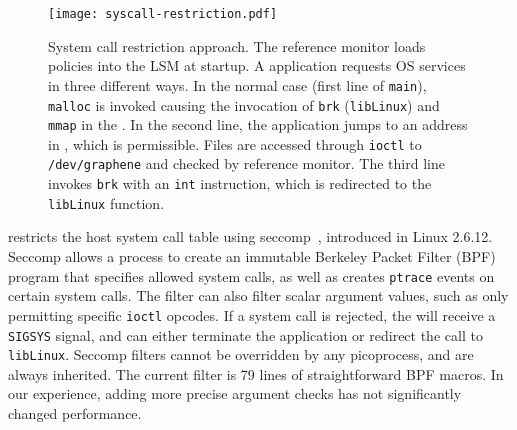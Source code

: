


\begin{figure}[t!]
\centering
\texttt{[image: syscall-restriction.pdf]}
\footnotesize
\caption[System call restriction approach in sysname{}]
{System call restriction approach. The reference monitor loads policies into the LSM at startup.  A \graphene{} application requests OS services in three different ways. 
In the normal case (first line of {\tt main}), {\tt malloc} is invoked causing the invocation of {\tt brk} ({\tt libLinux}) and {\tt mmap} in the \pal{}. In the second line, the application jumps to an address in \pal{}, which is permissible.
Files are accessed through {\tt ioctl} to {\tt /dev/graphene} and checked by reference monitor.
The third line invokes {\tt brk} with an {\tt int} instruction, which is redirected to the {\tt libLinux} function.}
\label{fig:graphene:syscall-restriction}
\end{figure}



\graphene{} restricts the host system call table 
using seccomp~\cite{seccomp}, introduced in Linux 2.6.12.
Seccomp allows a process to create an immutable Berkeley Packet Filter (BPF) program
that specifies allowed system calls, as well as creates {\tt ptrace} 
events on certain system calls.
The filter can also filter scalar argument values,
such as only permitting specific {\tt ioctl} opcodes.
If a system call is rejected, the \pal{} will receive a {\tt SIGSYS} signal,
and can either terminate the application or redirect the 
call to {\tt libLinux}.
Seccomp filters cannot be overridden by any picoprocess,
and are always inherited.
The current \graphene{} filter is 79 lines 
of straightforward BPF macros.  In our experience, adding more precise argument checks
has not significantly changed performance.

